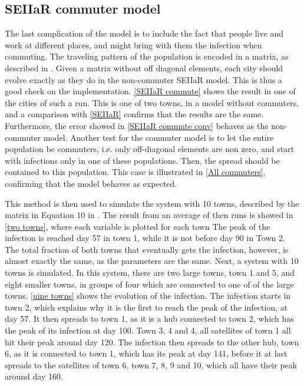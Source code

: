 \documentclass{article}
\begin{document}
    \subsection*{SEIIaR commuter model}
    The last complication of the model is to include the fact that people live and work at different places, and might bring with them the infection when commuting. 
    The traveling pattern of the population is encoded in a matrix, as described in \cite{exam}.
    Given a matrix without off diagonal elements, each city should evolve exactly as they do in the non-commuter SEIIaR model.
    This is thus a good check on the implementation.
    \autoref{SEIIaR commute} shows the result in one of the cities of such a run.
    This is one of two towns, in a model without commuters, and a comparison with \autoref{SEIIaR} confirms that the results are the same.
    Furthermore, the error showed in \autoref{SEIIaR commute conv} behaves as the non-commuter model.
    Another test for the commuter model is to let the entire population be commuters, i.e. only off-diagonal elements are non zero, and start with infections only in one of these populations.
    Then, the spread should be contained to this population.
    This case is illustrated in \autoref{All commuters}, confirming that the model behaves as expected.

    This method is then used to simulate the system with 10 towns, described by the matrix in Equation 10 in \cite{exam}.
    The result from an average of then runs is showed in \autoref{two towns}, where each variable is plotted for each town
    The peak of the infection is reached day 57 in town 1, while it is not before day 90 in Town 2.
    The total fraction of both towns that eventually gets the infection, however, is almost exactly the same, as the parameters are the same.
    Next, a system with 10 towns is simulated. 
    In this system, there are two large towns, town 1 and 5, and eight smaller towns, in groups of four which are connected to one of of the large towns.
    \autoref{nine towns} shows the evolution of the infection.
    The infection starts in town 2, which explains why it is the first to reach the peak of the infection, at day 57.
    It then spreads to town 1, as it is a hub connected to town 2, which has the peak of its infection at day 100. 
    Town 3, 4 and 4, all satellites of town 1 all hit their peak around day 120.
    The infection then spreads to the other hub, town 6, as it is connected to town 1, which has its peak at day 141, before it at last spreads to the satellites of town 6, town 7, 8, 9 and 10, which all have their peak around day 160.
\end{document}
